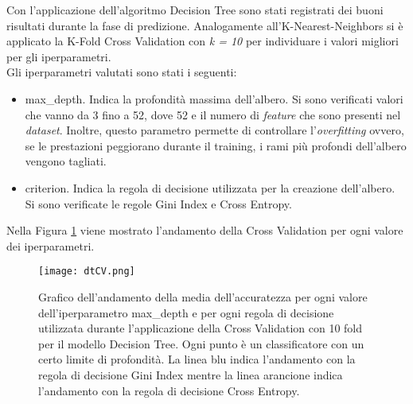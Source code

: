 Con l'applicazione dell'algoritmo Decision Tree sono stati registrati dei buoni risultati durante la fase di predizione. Analogamente all'K-Nearest-Neighbors si è applicato la K-Fold Cross Validation con \emph{k = 10} per individuare i valori migliori per gli iperparametri.\\
Gli iperparametri valutati sono stati i seguenti:
\begin{itemize}
	\item \textsf{max\_depth}. Indica la profondità massima dell'albero. Si sono verificati valori che vanno da 3 fino a 52, dove 52 e il numero di \emph{feature} che sono presenti nel \emph{dataset}. Inoltre, questo parametro permette di controllare l'\emph{overfitting} ovvero, se le prestazioni peggiorano durante il training, i rami più profondi dell'albero vengono tagliati.
	\item \textsf{criterion}. Indica la regola di decisione utilizzata per la creazione dell'albero. Si sono verificate le regole Gini Index e Cross Entropy.
\end{itemize}

Nella Figura \ref{fig:dtCV} viene mostrato l'andamento della Cross Validation per ogni valore dei iperparametri.
\begin{figure}[h]
	\begin{center}
		\texttt{[image: dtCV.png]}
		\caption{Grafico dell'andamento della media dell'accuratezza per ogni valore dell'iperparametro max\_depth e per ogni regola di decisione utilizzata durante l'applicazione della Cross Validation con 10 fold per il modello Decision Tree. Ogni punto è un classificatore con un certo limite di profondità. La linea blu indica l'andamento con la regola di decisione Gini Index mentre la linea arancione indica l'andamento con la regola di decisione Cross Entropy.
		} 
		\label{fig:dtCV}
	\end{center}
\end{figure}

